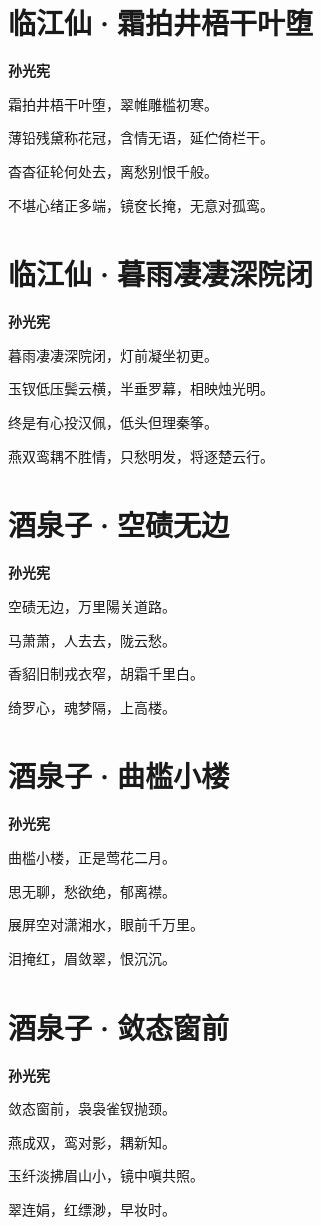 \documentclass[12pt,a4paper]{ctexbook}
\begin{document}
\section{临江仙·霜拍井梧干叶堕}
\textbf{孙光宪}\par\vspace{0.5em}
霜拍井梧干叶堕，翠帷雕槛初寒。\par
薄铅残黛称花冠，含情无语，延伫倚栏干。\par
杳杳征轮何处去，离愁别恨千般。\par
不堪心绪正多端，镜奁长掩，无意对孤鸾。\par

\section{临江仙·暮雨凄凄深院闭}
\textbf{孙光宪}\par\vspace{0.5em}
暮雨凄凄深院闭，灯前凝坐初更。\par
玉钗低压鬓云横，半垂罗幕，相映烛光明。\par
终是有心投汉佩，低头但理秦筝。\par
燕双鸾耦不胜情，只愁明发，将逐楚云行。\par

\section{酒泉子·空碛无边}
\textbf{孙光宪}\par\vspace{0.5em}
空碛无边，万里陽关道路。\par
马萧萧，人去去，陇云愁。\par
香貂旧制戎衣窄，胡霜千里白。\par
绮罗心，魂梦隔，上高楼。\par

\section{酒泉子·曲槛小楼}
\textbf{孙光宪}\par\vspace{0.5em}
曲槛小楼，正是莺花二月。\par
思无聊，愁欲绝，郁离襟。\par
展屏空对潇湘水，眼前千万里。\par
泪掩红，眉敛翠，恨沉沉。\par

\section{酒泉子·敛态窗前}
\textbf{孙光宪}\par\vspace{0.5em}
敛态窗前，袅袅雀钗抛颈。\par
燕成双，鸾对影，耦新知。\par
玉纤淡拂眉山小，镜中嗔共照。\par
翠连娟，红缥渺，早妆时。\par
\end{document}
